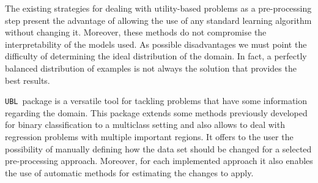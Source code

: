 \documentclass[10pt,a4paper]{article}\usepackage[]{graphicx}\usepackage[]{color}
\newcommand{\UBLp}{\texttt{UBL}\ package  }
\begin{document}
The existing strategies for dealing with utility-based problems as a pre-processing step present the advantage of allowing the use of any standard learning algorithm without changing it. Moreover, these methods do not compromise the interpretability of the models used. As possible disadvantages we must point the difficulty of determining the ideal distribution of the domain. In fact, a perfectly balanced distribution of examples is not always the solution that provides the best results.

\UBLp is a versatile tool for tackling problems that have some information regarding the domain. This package extends some methods previously developed for binary classification to a multiclass setting and also allows to deal with regression problems with multiple important regions. It offers to the user the possibility of manually defining how the data set should be changed for a selected pre-processing approach. Moreover, for each implemented approach it also enables the use of automatic methods for estimating the changes to apply.

\newpage



\end{document}
